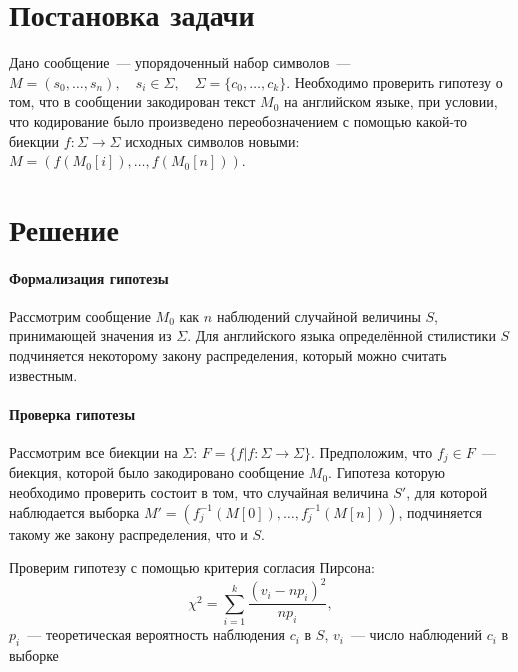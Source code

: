 \documentclass[a4paper,10pt]{article}
\begin{document}
%


\section{Постановка задачи}
Дано сообщение~--- упорядоченный набор символов~--- 
$M = (s_0, \ldots, s_n), \quad s_i \in \Sigma, \quad \Sigma = \{ c_0, \ldots, c_k \}$.
Необходимо проверить гипотезу о том, что в сообщении закодирован текст $M_0$
на английском языке, при условии, что кодирование было произведено 
переобозначением с помощью какой-то биекции 
$f \colon \Sigma \rightarrow \Sigma$ 
исходных символов новыми: 
$M = (f(M_0[i]), \ldots, f(M_0[n]))$.

\section{Решение}
\paragraph{Формализация гипотезы}
Рассмотрим сообщение $M_0$ как $n$ наблюдений случайной величины $S$, 
принимающей значения из $\Sigma$.
Для английского языка определённой стилистики $S$ подчиняется некоторому
закону распределения, который можно считать известным.

\paragraph{Проверка гипотезы}
Рассмотрим все биекции на $\Sigma$: 
$F = \{ f | f \colon \Sigma \rightarrow \Sigma \}$.
Предположим, что $f_j \in F$~--- биекция, которой было закодировано сообщение 
$M_0$.
Гипотеза которую необходимо проверить состоит в том, 
что случайная величина $S'$, для которой наблюдается выборка 
$M' = (f_j^{-1}(M[0]), \ldots, f_j^{-1}(M[n]))$,
подчиняется такому же закону распределения, что и $S$.

Проверим гипотезу с помощью критерия согласия Пирсона:
$$ \chi^2 = \sum_{i=1}^{k}\frac{(v_i - n p_i)^2}{n p_i}, $$
$p_i$~--- теоретическая вероятность наблюдения $c_i$ в $S$,
$v_i$~--- число наблюдений $c_i$ в выборке $ $





%
%
\end{document}
